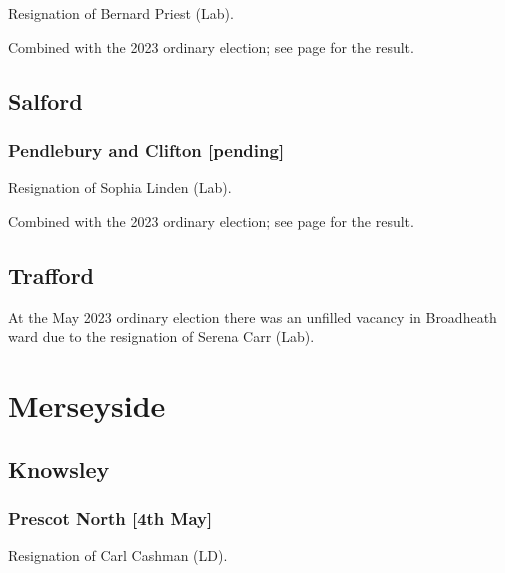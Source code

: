 \documentclass[a4paper,openany]{book}
\begin{document}
\begin{resultsiii}
Resignation of Bernard Priest (Lab).

Combined with the 2023 ordinary election; see page \pageref{ArdwickManchester} for the result.

\subsection*{Salford}

\subsubsection*{Pendlebury and Clifton \hspace*{\fill}\nolinebreak[1]%
	\enspace\hspace*{\fill}
	[pending]}


Resignation of Sophia Linden (Lab).

Combined with the 2023 ordinary election; see page \pageref{PendleburyCliftonSalford} for the result.

\subsection*{Trafford}

At the May 2023 ordinary election there was an unfilled vacancy in Broadheath ward due to the resignation of Serena Carr (Lab).%

\section{Merseyside}

\subsection*{Knowsley}

\subsubsection*{Prescot North \hspace*{\fill}\nolinebreak[1]%
	\enspace\hspace*{\fill}
	[4th May]}


Resignation of Carl Cashman (LD).


\end{resultsiii}
\end{document}
